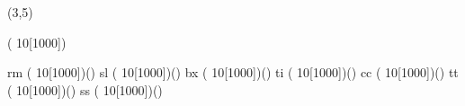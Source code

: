 %
%
%
%
%
%
%

\lhvercheck(3,5)

     \tablevalues               ( 10[1000])

     \makefont\fonttwoletters rm   %
                                ( 10[1000])()
     \makefont\fonttwoletters sl   %
                                ( 10[1000])()
     \makefont\fonttwoletters bx   %
                                ( 10[1000])()
     \makefont\fonttwoletters ti   %
                                ( 10[1000])()
     \makefont\fonttwoletters cc   %
                                ( 10[1000])()
     \makefont\fonttwoletters tt   %
                                ( 10[1000])()
     \makefont\fonttwoletters ss   %
                                ( 10[1000])()
